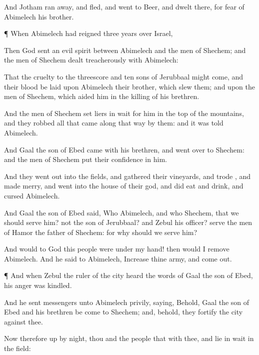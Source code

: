 {And
Jotham ran
away, and
fled, and
went to
Beer, and
dwelt there, for
fear of
Abimelech his
brother.


\par }{\PP {}¶ When
Abimelech had
reigned
three
years over
Israel,

Then
God
sent an
evil
spirit between
Abimelech and the
men of
Shechem; and the
men of
Shechem dealt
treacherously with
Abimelech:

That the
cruelty
{} to the threescore and
ten
sons of
Jerubbaal might
come, and their
blood be
laid upon
Abimelech their
brother, which
slew them; and upon the
men of
Shechem, which
aided him in the
killing of his
brethren.

And the
men of
Shechem
set liers in
wait for him in the
top of the
mountains, and they
robbed all that
came along that
way by them: and it was
told
Abimelech.

And
Gaal the
son of
Ebed
came with his
brethren, and went
over to
Shechem: and the
men of
Shechem put their
confidence in him.

And they went
out into the
fields, and
gathered their
vineyards, and
trode
{}, and
made
merry, and
went into the
house of their
god, and did
eat and
drink, and
cursed
Abimelech.

And
Gaal the
son of
Ebed
said, Who
{}
Abimelech, and who
{}
Shechem, that we should
serve him?
{} not
{} the
son of
Jerubbaal? and
Zebul his
officer?
serve the
men of
Hamor the
father of
Shechem: for why should we
serve him?

And would to God this
people were
under my
hand! then would I
remove
Abimelech. And he
said to
Abimelech,
Increase thine
army, and come
out.


\par }{\PP {}¶ And when
Zebul the
ruler of the
city
heard the
words of
Gaal the
son of
Ebed, his
anger was
kindled.

And he
sent
messengers unto
Abimelech
privily,
saying, Behold,
Gaal the
son of
Ebed and his
brethren be
come to
Shechem; and, behold, they
fortify the
city against thee.

Now therefore
up by
night, thou and the
people that
{} with thee, and lie in
wait in the
field:

}
